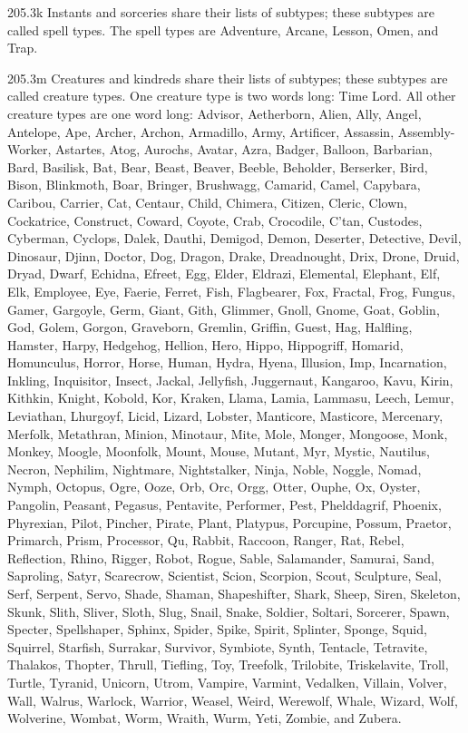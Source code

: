 205.3k Instants and sorceries share their lists of subtypes; these subtypes are called spell types. The spell types are Adventure, Arcane, Lesson, Omen, and Trap.

205.3m Creatures and kindreds share their lists of subtypes; these subtypes are called creature types. One creature type is two words long: Time Lord. All other creature types are one word long: Advisor, Aetherborn, Alien, Ally, Angel, Antelope, Ape, Archer, Archon, Armadillo, Army, Artificer, Assassin, Assembly-Worker, Astartes, Atog, Aurochs, Avatar, Azra, Badger, Balloon, Barbarian, Bard, Basilisk, Bat, Bear, Beast, Beaver, Beeble, Beholder, Berserker, Bird, Bison, Blinkmoth, Boar, Bringer, Brushwagg, Camarid, Camel, Capybara, Caribou, Carrier, Cat, Centaur, Child, Chimera, Citizen, Cleric, Clown, Cockatrice, Construct, Coward, Coyote, Crab, Crocodile, C’tan, Custodes, Cyberman, Cyclops, Dalek, Dauthi, Demigod, Demon, Deserter, Detective, Devil, Dinosaur, Djinn, Doctor, Dog, Dragon, Drake, Dreadnought, Drix, Drone, Druid, Dryad, Dwarf, Echidna, Efreet, Egg, Elder, Eldrazi, Elemental, Elephant, Elf, Elk, Employee, Eye, Faerie, Ferret, Fish, Flagbearer, Fox, Fractal, Frog, Fungus, Gamer, Gargoyle, Germ, Giant, Gith, Glimmer, Gnoll, Gnome, Goat, Goblin, God, Golem, Gorgon, Graveborn, Gremlin, Griffin, Guest, Hag, Halfling, Hamster, Harpy, Hedgehog, Hellion, Hero, Hippo, Hippogriff, Homarid, Homunculus, Horror, Horse, Human, Hydra, Hyena, Illusion, Imp, Incarnation, Inkling, Inquisitor, Insect, Jackal, Jellyfish, Juggernaut, Kangaroo, Kavu, Kirin, Kithkin, Knight, Kobold, Kor, Kraken, Llama, Lamia, Lammasu, Leech, Lemur, Leviathan, Lhurgoyf, Licid, Lizard, Lobster, Manticore, Masticore, Mercenary, Merfolk, Metathran, Minion, Minotaur, Mite, Mole, Monger, Mongoose, Monk, Monkey, Moogle, Moonfolk, Mount, Mouse, Mutant, Myr, Mystic, Nautilus, Necron, Nephilim, Nightmare, Nightstalker, Ninja, Noble, Noggle, Nomad, Nymph, Octopus, Ogre, Ooze, Orb, Orc, Orgg, Otter, Ouphe, Ox, Oyster, Pangolin, Peasant, Pegasus, Pentavite, Performer, Pest, Phelddagrif, Phoenix, Phyrexian, Pilot, Pincher, Pirate, Plant, Platypus, Porcupine, Possum, Praetor, Primarch, Prism, Processor, Qu, Rabbit, Raccoon, Ranger, Rat, Rebel, Reflection, Rhino, Rigger, Robot, Rogue, Sable, Salamander, Samurai, Sand, Saproling, Satyr, Scarecrow, Scientist, Scion, Scorpion, Scout, Sculpture, Seal, Serf, Serpent, Servo, Shade, Shaman, Shapeshifter, Shark, Sheep, Siren, Skeleton, Skunk, Slith, Sliver, Sloth, Slug, Snail, Snake, Soldier, Soltari, Sorcerer, Spawn, Specter, Spellshaper, Sphinx, Spider, Spike, Spirit, Splinter, Sponge, Squid, Squirrel, Starfish, Surrakar, Survivor, Symbiote, Synth, Tentacle, Tetravite, Thalakos, Thopter, Thrull, Tiefling, Toy, Treefolk, Trilobite, Triskelavite, Troll, Turtle, Tyranid, Unicorn, Utrom, Vampire, Varmint, Vedalken, Villain, Volver, Wall, Walrus, Warlock, Warrior, Weasel, Weird, Werewolf, Whale, Wizard, Wolf, Wolverine, Wombat, Worm, Wraith, Wurm, Yeti, Zombie, and Zubera.

